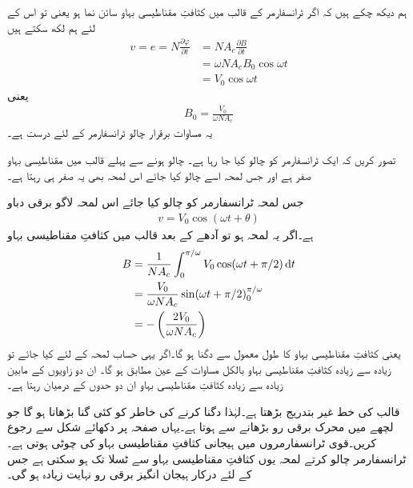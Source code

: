 ہم دیکھ چکے ہیں کہ اگر ٹرانسفارمر کے قالب میں کثافتِ مقناطیسی بہاو سائن نما ہو یعنی   تو اس کے لئے ہم لکھ سکتے ہیں
\begin{align*}
v=e=N \frac{\partial \varphi}{\partial t}&=N A_c \frac{\partial B}{\partial t}\\
&=\omega N A_c B_0 \cos \omega t\\
&=V_0 \cos \omega t
\end{align*}
یعنی
\begin{align}\label{مساوات_ٹرانسفارمر_درکار_کثافت_بہاو}
B_0=\frac{V_0}{\omega N A_c}
\end{align}
یہ مساوات برقرار چالو ٹرانسفارمر کے لئے درست ہے۔

تصور کریں کہ ایک ٹرانسفارمر کو چالو کیا جا رہا ہے۔ چالو ہونے سے پہلے قالب میں مقناطیسی بہاو صفر ہے اور جس لمحہ اسے چالو کیا جائے اس لمحہ بھی یہ صفر ہی رہتا ہے۔	

جس لمحہ ٹرانسفارمر کو چالو کیا جائے اس لمحہ لاگو برقی دباو
\begin{align*}
v=V_0 \cos (\omega t+\theta)
\end{align*}
ہے۔اگر  یہ لمحہ ہو تو آدھے   کے بعد قالب میں کثافتِ مقناطیسی بہاو
\begin{align*}
B&=\frac{1}{N A_c} \int_{0}^{\pi/\omega} V_0 \cos (\omega t+\pi/2) \dif t\\
&=\frac{V_0}{\omega N A_c} \sin (\omega t+\pi/2)_0^{\pi/\omega}\\
&=-\left(\frac{2 V_0}{\omega N A_c} \right)
\end{align*}
یعنی کثافتِ مقناطیسی بہاو کا طول معمول سے دگنا ہو گا۔اگر یہی حساب  لمحہ کے لئے کیا جائے تو زیادہ سے زیادہ کثافتِ مقناطیسی بہاو بالکل مساوات   کے عین مطابق ہو گا۔ ان دو زاویوں کے مابین زیادہ سے زیادہ کثافتِ مقناطیسی بہاو ان دو حدوں کے درمیان رہتا ہے۔ 

قالب کی   خط غیر بتدریج بڑھتا ہے۔لہٰذا   دگنا کرنے کی خاطر  کو کئی گنا بڑھانا ہو گا جو لچھے میں محرک برقی رو بڑھانے سے ہوتا ہے۔یہاں صفحہ  پر دکھائے  شکل   سے رجوع کریں۔قوی ٹرانسفارمروں میں ہیجانی کثافتِ مقناطیسی بہاو کی چوٹی  ہوتی ہے۔ٹرانسفارمر چالو کرتے لمحہ یوں کثافتِ مقناطیسی بہاو   سے   ٹسلا تک ہو سکتی ہے جس کے لئے درکار ہیجان انگیز برقی رو نہایت زیادہ ہو گی۔

